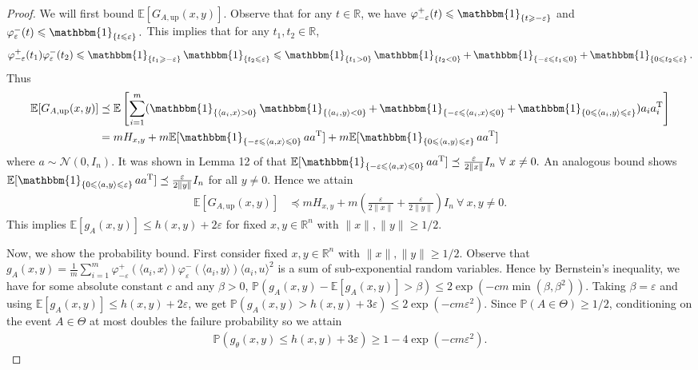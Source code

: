 \documentclass[11pt]{article}
\newcommand{\R}{\mathbb{R}}
\newcommand{\N}{\mathcal{N}}
\newcommand{\Pro}{\mathbb{P}}
\newcommand{\one}{\operatorname{\mathbbm{1}}}
\newcommand{\T}{\mathrm{T}}
\renewcommand{\epsilon}{\varepsilon}
\newcommand{\E}{\mathbb{E}}
\begin{document}
\begin{proof} We will first bound $\E[G_{A,\text{up}}(x,y)]$. Observe that for any $t \in \R$, we have $\varphi^+_{-\epsilon}(t) \leqslant \one_{\{t \geqslant - \epsilon\}}$ and $\varphi^-_{\epsilon}(t) \leqslant \one_{\{t \leqslant \epsilon\}}.$ This implies that for any $t_1,t_2 \in \R$, $$\varphi^+_{-\epsilon}(t_1)\varphi^-_{\epsilon}(t_2) \leqslant \one_{\{t_1 \geqslant-\epsilon\}}\one_{\{t_2 \leqslant\epsilon\}}  \leqslant \one_{\{t_1 > 0\}}\one_{\{t_2 < 0\}} + \one_{\{-\epsilon \leqslant t_1 \leqslant 0\}} + \one_{\{0 \leqslant t_2 \leqslant \epsilon\}}.$$ Thus \begin{align*}
    \E[G_{A,\text{up}}(x,y)] 
    & \preceq \E\left[\sum_{i=1}^m (\one_{\{\langle a_i,x\rangle > 0\}}\one_{\{\langle a_i,y\rangle < 0\}} + \one_{\{-\epsilon \leqslant\langle a_i,x\rangle \leqslant 0\}} + \one_{\{0 \leqslant\langle a_i,y\rangle \leqslant \epsilon\}})a_ia_i^{\T}\right] \\
    & = mH_{x,y} + m \E[\one_{\{-\epsilon \leqslant\langle a,x\rangle \leqslant 0\}}aa^{\T}] + m \E[\one_{\{0 \leqslant\langle a,y\rangle \leqslant \epsilon\}}aa^{\T}]
\end{align*} where $a \sim \N(0,I_n)$. It was shown in Lemma 12 of \cite{HV2017} that $\E[\one_{\{-\epsilon \leqslant\langle a,x\rangle \leqslant 0\}}aa^{\T}] \preceq \frac{\epsilon}{2\|x\|}I_n\ \forall\ x \neq 0.$ An analogous bound shows $\E[\one_{\{0 \leqslant\langle a,y\rangle \leqslant \epsilon\}}aa^{\T}] \preceq \frac{\epsilon}{2\|y\|}I_n$ for all $y \neq 0$. Hence we attain \begin{align*}
     \E[G_{A,\text{up}}(x,y)] & \preceq mH_{x,y} + m \left(\frac{\epsilon}{2\|x\|} + \frac{\epsilon}{2\|y\|}\right)I_n\ \forall\ x,y \neq 0.
\end{align*} This implies $\E[g_A(x,y)] \leqslant h(x,y) + 2\epsilon$ for fixed $x,y \in \R^n$ with $\|x\|,\|y\|\geqslant 1/2$.

Now, we show the probability bound. First consider fixed $x,y \in \R^n$ with $\|x\|,\|y\|\geqslant 1/2.$  Observe that 
    $g_A(x,y) = \frac{1}{m}\sum_{i=1}^m\varphi_{-\epsilon}^{+}(\langle a_i,x\rangle)\varphi_{\epsilon}^{-}(\langle a_i,y\rangle)\langle a_i,u\rangle^2$ is a sum of sub-exponential random variables. Hence by Bernstein's inequality, we have for some absolute constant $c$ and any $\beta > 0$, $\Pro\left(g_A(x,y) - \E[g_A(x,y)] > \beta\right) \leqslant 2 \exp(-cm \min(\beta,\beta^2)).$ Taking $\beta = \epsilon$ and using $\E[g_A(x,y)] \leqslant h(x,y) + 2\epsilon$, we get $\Pro\left(g_A(x,y) > h(x,y) + 3\epsilon\right) \leqslant 2\exp(-cm\epsilon^2).$ Since $\Pro(A \in \Theta) \geqslant 1/2$, conditioning on the event $A \in \Theta$ at most doubles the failure probability so we attain \begin{align}\Pro\left(g_{\theta}(x,y) \leqslant h(x,y) + 3\epsilon\right) \geqslant 1 - 4\exp(-cm\epsilon^2). \label{fixed_xy_prob_bound}\end{align}


\end{proof}
\end{document}
